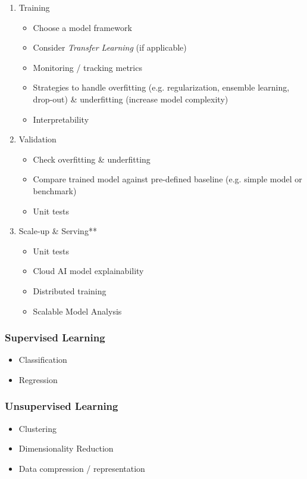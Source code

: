 \documentclass[10pt,landscape,letterpaper]{cheatsheet}
\begin{document}
\begin{multicols}{3}
\begin{enumerate}
    \item Training
    \begin{itemize}
        \item Choose a model framework
        \item Consider \emph{Transfer Learning} (if applicable)
        \item Monitoring / tracking metrics
        \item Strategies to handle overfitting (e.g. regularization, ensemble learning, drop-out) \& underfitting (increase model complexity)
        \item Interpretability
    \end{itemize}
    \item Validation
    \begin{itemize}
        \item Check overfitting \& underfitting
        \item Compare trained model against pre-defined baseline (e.g. simple model or benchmark)
        \item Unit tests
    \end{itemize}
    \item Scale-up \& Serving**
    \begin{itemize}
        \item Unit tests
        \item Cloud AI model explainability
        \item Distributed training
        \item Scalable Model Analysis
    \end{itemize}
\end{enumerate}

\subsubsection{Supervised Learning}

\begin{itemize}
    \item Classification
    \item Regression
\end{itemize}

\subsubsection{Unsupervised Learning}

\begin{itemize}
    \item Clustering
    \item Dimensionality Reduction
    \item Data compression / representation
\end{itemize}


\end{multicols}
\end{document}
